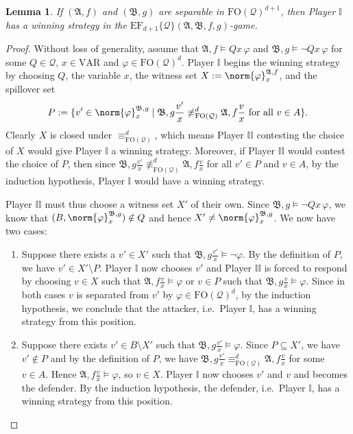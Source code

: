 \documentclass{article}
\newtheorem{lemma}[theorem]{Lemma}
\theoremstyle{definition}
\begin{document}
\begin{lemma}\label{lem:equivalence-implies-game}
    If $(\mathfrak{A},f)$ and $(\mathfrak{B},g)$ are separable in $\mathrm{FO}(\mathcal{Q})^{d+1}$, then Player $\mathbb{I}$ has a winning strategy in the $\mathrm{EF}_{d+1}\{\mathcal{Q}\}(\mathfrak{A},\mathfrak{B},f,g)$-game.
\end{lemma}
\begin{proof}
    Without loss of generality, assume that $\mathfrak{A},f\models Qx\,\varphi$ and $\mathfrak{B},g\models\neg Qx\,\varphi$ for some $Q\in\mathcal{Q}$, $x\in\mathrm{VAR}$ and $\varphi\in\mathrm{FO}(\mathcal{Q})^d$. Player $\mathbb{I}$ begins the winning strategy by choosing $Q$, the variable $x$, the witness set
    $X:=\norm{\varphi}^{\mathfrak{A},f}_x$, and the spillover set
    \[
        P:=\{v'\in\norm{\varphi}_x^{\mathfrak{B},g}\mid
        \mathfrak{B},g\frac{v'}{x}\not\equiv^d_{\mathrm{FO}(\mathcal{Q})}
        \mathfrak{A},f\frac{v}{x}\text{ for all }v\in A\}.
    \]
    Clearly $X$ is closed under $\equiv^d_{\mathrm{FO}(\mathcal{Q})}$, which means Player $\mathbb{II}$ contesting the choice of $X$ would give Player $\mathbb{I}$ a winning strategy. Moreover, if Player $\mathbb{II}$ would contest the choice of $P$, then since $\mathfrak{B},g\frac{v'}{x}\not\equiv^d_{\mathrm{FO}(\mathcal{Q})} \mathfrak{A},f\frac{v}{x}$ for all $v'\in P$ and $v\in A$, by the induction hypothesis, Player $\mathbb{I}$ would have a winning strategy.

    Player $\mathbb{II}$ must thus choose a witness set $X'$ of their own. Since $\mathfrak{B},g\models\neg Qx\,\varphi$, we know that $(B,\norm{\varphi}_x^{\mathfrak{B},g})\notin Q$ and hence $X'\neq\norm{\varphi}_x^{\mathfrak{B},g}$. We now have two cases:
    \begin{enumerate}
        \item Suppose there exists a $v'\in X'$ such that    $\mathfrak{B},g\frac{v'}{x}\models\neg\varphi$. By the definition of    $P$, we have $v'\in X'\setminus P$. Player $\mathbb{I}$ now chooses    $v'$ and Player $\mathbb{II}$ is forced to respond by choosing    $v\in X$ such that $\mathfrak{A},f\frac{v}{x}\models\varphi$ or    $v\in P$ such that $\mathfrak{B},g\frac{v}{x}\models\varphi$. Since    in both cases $v$ is separated from $v'$ by    $\varphi\in\mathrm{FO}(\mathcal{Q})^d$, by the induction hypothesis,    we conclude that the attacker, i.e.\ Player $\mathbb{I}$, has a    winning strategy from this position.
        \item Suppose there exists $v'\in B\setminus X'$ such that    $\mathfrak{B},g\frac{v'}{x}\models\varphi$. Since $P\subseteq X'$,    we have $v'\notin P$ and by the definition of $P$, we have    $\mathfrak{B},g\frac{v'}{x}\equiv^d_{\mathrm{FO}(\mathcal{Q})}    \mathfrak{A},f\frac{v}{x}$ for some $v\in A$. Hence    $\mathfrak{A},f\frac{v}{x}\models\varphi$, so $v\in X$. Player    $\mathbb{I}$ now chooses $v'$ and $v$ and becomes the defender. By    the induction hypothesis, the defender, i.e.\ Player $\mathbb{I}$,    has a winning strategy from this position.\qedhere
    \end{enumerate}
\end{proof}
\end{document}
